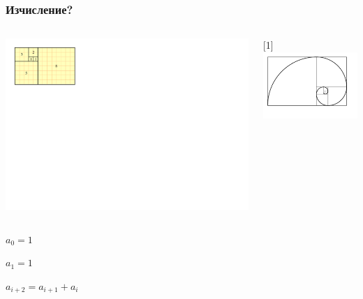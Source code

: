 \documentclass{beamer}
\begin{document}
\begin{frame}[fragile]
\frametitle{Изчисление?}


\begin{columns}[c]
  \begin{column}{0.5\textwidth}

    \includegraphics[width=19cm]{images/fib_tiling}
  \end{column}
  \begin{column}{0.5\textwidth}
  \vspace*{250pt}
    \begin{turn}{90}
    \scalebox{1}[1]{\includegraphics[width=7cm]{images/fib_spiral}}
    \end{turn}
  \end{column}
\end{columns}


\vspace*{-300pt}

$a_0=1$


$a_1=1$


$a_{i+2} = a_{i+1} + a_i $



\end{frame}
\end{document}
